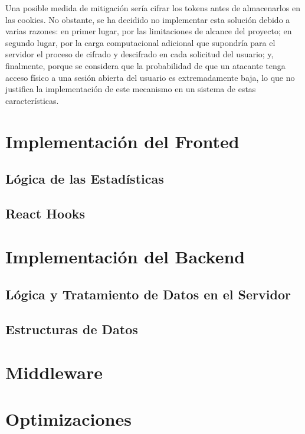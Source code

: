 Una posible medida de mitigación sería cifrar los tokens antes de almacenarlos en las cookies. No obstante, se ha decidido no implementar esta solución debido a varias razones: en primer lugar, por las limitaciones de alcance del proyecto; en segundo lugar, por la carga computacional adicional que supondría para el servidor el proceso de cifrado y descifrado en cada solicitud del usuario; y, finalmente, porque se considera que la probabilidad de que un atacante tenga acceso físico a una sesión abierta del usuario es extremadamente baja, lo que no justifica la implementación de este mecanismo en un sistema de estas características.

\section{Implementación del Fronted}

\subsection{Lógica de las Estadísticas}

\subsection{React Hooks}

\section{Implementación del Backend}

\subsection{Lógica y Tratamiento de Datos en el Servidor}

\subsection{Estructuras de Datos}

\section{Middleware}

\section{Optimizaciones}